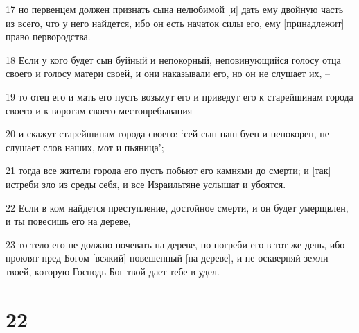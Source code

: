 \par 17 но первенцем должен признать сына нелюбимой [и] дать ему двойную часть из всего, что у него найдется, ибо он есть начаток силы его, ему [принадлежит] право первородства.
\par 18 Если у кого будет сын буйный и непокорный, неповинующийся голосу отца своего и голосу матери своей, и они наказывали его, но он не слушает их, --
\par 19 то отец его и мать его пусть возьмут его и приведут его к старейшинам города своего и к воротам своего местопребывания
\par 20 и скажут старейшинам города своего: `сей сын наш буен и непокорен, не слушает слов наших, мот и пьяница';
\par 21 тогда все жители города его пусть побьют его камнями до смерти; и [так] истреби зло из среды себя, и все Израильтяне услышат и убоятся.
\par 22 Если в ком найдется преступление, достойное смерти, и он будет умерщвлен, и ты повесишь его на дереве,
\par 23 то тело его не должно ночевать на дереве, но погреби его в тот же день, ибо проклят пред Богом [всякий] повешенный [на дереве], и не оскверняй земли твоей, которую Господь Бог твой дает тебе в удел.

\chapter{22}

